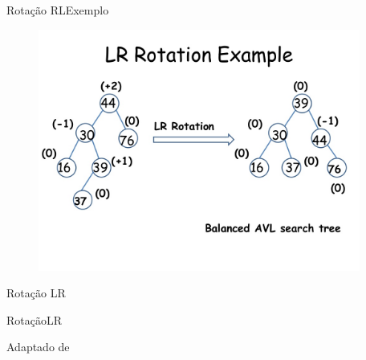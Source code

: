 \documentclass[aspectratio=169]{beamer}
\begin{document}
\begin{frame}{Rotação RL}{Exemplo}
\begin{figure}[!h]
  \centering
  \includegraphics[width=300pt]{imagens/lr_rotation_example1.png}
  \label{fig_lr_rotation_example1}
\end{figure}
\end{frame}

\begin{frame}{Rotação LR}
\begin{algorithm}[H]
\caption{RotaçãoLR} 
\label{RotacaoLR}
\end{algorithm}
\tiny{Adaptado de \cite{Backes2016}}  
\end{frame}
\end{document}

